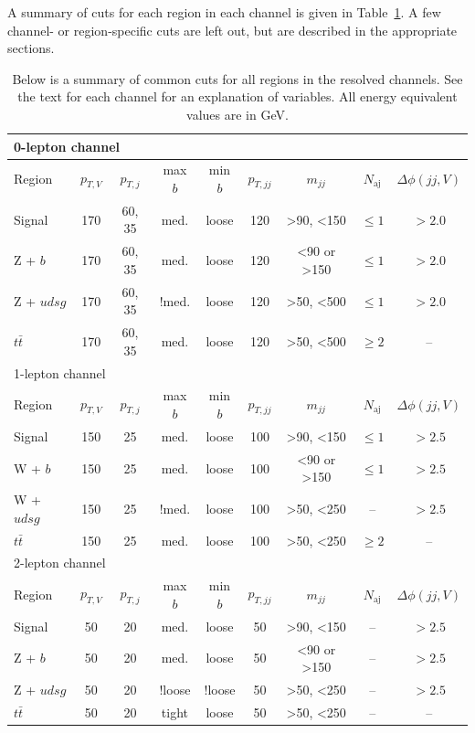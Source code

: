A summary of cuts for each region in each channel
is given in Table~\ref{tab:resolved}.
A few channel- or region-specific cuts are left out,
but are described in the appropriate sections.
\begin{table}
  \centering
  \caption[Summary of resolved selection cuts]{
    Below is a summary of common cuts for all regions in the resolved channels.
    See the text for each channel for an explanation of variables.
    All energy equivalent values are in GeV.
  }
  \begin{tabular}{|l|c|c|c|c|c|c|c|c|}
    \hline
    \multicolumn{9}{|l|}{0-lepton channel} \\
    \hline
    Region & $p_{T,V}$ & $p_{T,j}$ & max $b$ & min $b$ & $p_{T,jj}$ & $m_{jj}$ & $N_\textrm{aj}$ & $\Delta\phi(jj, V)$ \\
    \hline
    Signal & 170 & 60, 35 & med. & loose & 120 & >90, <150 & $\le 1$ & $> 2.0$ \\
    Z + $b$ & 170 & 60, 35 & med. & loose & 120 & <90 or >150 & $\le 1$ & $> 2.0$ \\
    Z + $udsg$ & 170 & 60, 35 & !med. & loose & 120 & >50, <500 & $\le 1$ & $> 2.0$ \\
    $t\bar{t}$ & 170 & 60, 35 & med. & loose & 120 & >50, <500 & $\ge 2$ & -- \\
    \hline
    \hline
    \multicolumn{9}{|l|}{1-lepton channel} \\
    \hline
    Region & $p_{T,V}$ & $p_{T,j}$ & max $b$ & min $b$ & $p_{T,jj}$ & $m_{jj}$ & $N_\textrm{aj}$ & $\Delta\phi(jj, V)$ \\
    \hline
    Signal & 150 & 25 & med. & loose & 100 & >90, <150 & $\le 1$ & $> 2.5$ \\
    W + $b$ & 150 & 25 & med. & loose & 100 & <90 or >150 & $\le 1$ & $> 2.5$ \\
    W + $udsg$ & 150 & 25 & !med. & loose & 100 & >50, <250 & -- & $> 2.5$ \\
    $t\bar{t}$ & 150 & 25 & med. & loose & 100 & >50, <250 & $\ge 2$ & -- \\
    \hline
    \hline
    \multicolumn{9}{|l|}{2-lepton channel} \\
    \hline
    Region & $p_{T,V}$ & $p_{T,j}$ & max $b$ & min $b$ & $p_{T,jj}$ & $m_{jj}$ & $N_\textrm{aj}$ & $\Delta\phi(jj, V)$ \\
    \hline
    Signal & 50 & 20 & med. & loose & 50 & >90, <150 & -- & $> 2.5$ \\
    Z + $b$ & 50 & 20 & med. & loose & 50 & <90 or >150 & -- & $> 2.5$ \\
    Z + $udsg$ & 50 & 20 & !loose & !loose & 50 & >50, <250 & -- & $> 2.5$ \\
    $t\bar{t}$ & 50 & 20 & tight & loose & 50 & >50, <250 & -- & -- \\
    \hline
  \end{tabular}
  \label{tab:resolved}
\end{table}

